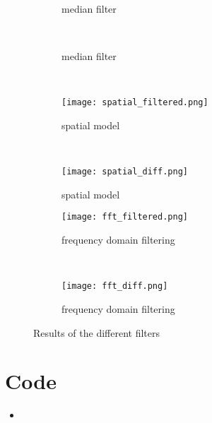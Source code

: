 \documentclass{article}
\newcommand{\matlabscript}[2]
  {\begin{itemize}\item[]\end{itemize}}
\begin{document}
\begin{spacing}{1.1}
{\begin{figure}[H]
        \centering
        \begin{subfigure}[b]{0.3\textwidth}
                \caption{median filter}
        \end{subfigure}%
        ~ %
        \begin{subfigure}[b]{0.3\textwidth}
                \caption{median filter}
        \end{subfigure}
\\
        \begin{subfigure}[b]{0.3\textwidth}
                 \texttt{[image: spatial\_filtered.png]}
                \caption{spatial model}
        \end{subfigure}%
        ~ %
        \begin{subfigure}[b]{0.3\textwidth}
                 \texttt{[image: spatial\_diff.png]}
                \caption{spatial model}
        \end{subfigure}

        \begin{subfigure}[b]{0.3\textwidth}
                 \texttt{[image: fft\_filtered.png]}
                \caption{frequency domain filtering}
        \end{subfigure}%
        ~ %
        \begin{subfigure}[b]{0.3\textwidth}
                 \texttt{[image: fft\_diff.png]}
                \caption{frequency domain filtering}
        \end{subfigure}
        \caption{Results of the different filters}\label{fig:animals3}
\end{figure}
}
\appendix
\section{Code}
\matlabscript{assignment2}{}
\end{spacing}


\end{document}
